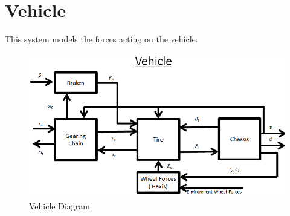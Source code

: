 \documentclass[../SimBALink.tex]{subfiles}
\begin{document}
\section{Vehicle} This system models the forces acting on the vehicle.
\begin{figure}[h!]
  \centering
  \includegraphics[scale=.75]{Vehicle_Diagram}
  \caption{Vehicle Diagram}
\end{figure}





\end{document}
